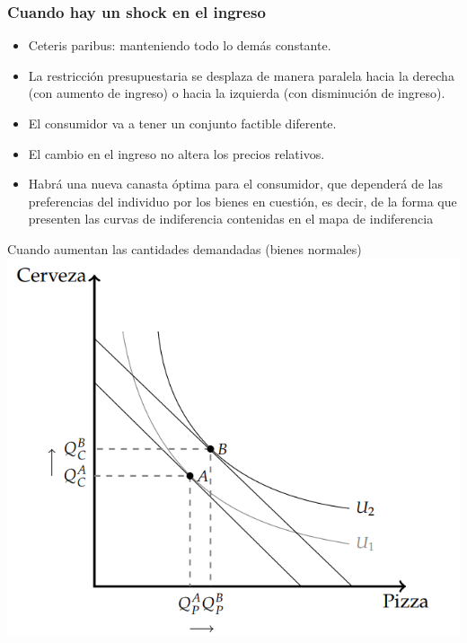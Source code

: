 \documentclass{beamer}
\begin{document}
\begin{frame}
\frametitle{Cuando hay un shock en el ingreso}
\begin{itemize}
    \item Ceteris paribus: manteniendo todo lo demás constante.
    \item La restricción presupuestaria se desplaza de manera paralela hacia la derecha (con aumento de ingreso) o hacia la izquierda (con disminución de ingreso).
    \item El consumidor va a tener un conjunto factible diferente.
    \item El cambio en el ingreso no altera los precios relativos.
    \item Habrá una nueva canasta óptima para el consumidor, que dependerá de las preferencias del individuo por los bienes en cuestión, es decir, de la forma que presenten las curvas de indiferencia contenidas en el mapa de indiferencia
\end{itemize}
\end{frame}

\begin{frame}{Cuando aumentan las cantidades demandadas (bienes normales)}
    \centering
    \includegraphics[scale=0.5]{../Figures/C.8.4.png}
\end{frame}
\end{document}
